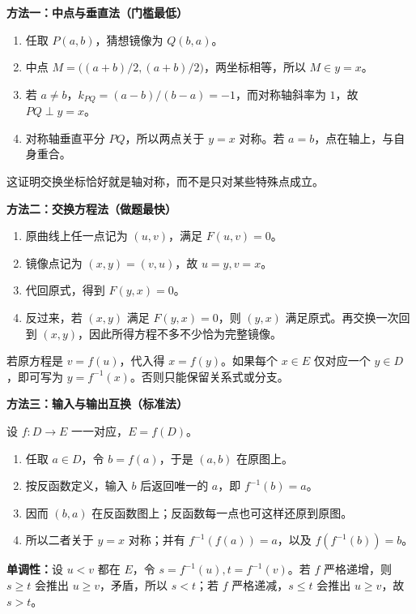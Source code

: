 \clearpage
\begin{proofbox}
\textbf{\textcolor{CProof}{方法一：中点与垂直法（门槛最低）}}


\begin{enumerate}[leftmargin=*,itemsep=.45em]
\item 任取 $P(a,b)$，猜想镜像为 $Q(b,a)$。
\item 中点 $M=\bigl((a+b)/2,(a+b)/2\bigr)$，两坐标相等，所以 $M\in y=x$。
\item 若 $a\ne b$，$k_{PQ}=(a-b)/(b-a)=-1$，而对称轴斜率为 $1$，故 $PQ\perp y=x$。
\item 对称轴垂直平分 $PQ$，所以两点关于 $y=x$ 对称。若 $a=b$，点在轴上，与自身重合。
\end{enumerate}
这证明交换坐标恰好就是轴对称，而不是只对某些特殊点成立。
\end{proofbox}
\clearpage
\begin{proofbox}
\textbf{\textcolor{CProof}{方法二：交换方程法（做题最快）}}


\begin{enumerate}[leftmargin=*,itemsep=.45em]
\item 原曲线上任一点记为 $(u,v)$，满足 $F(u,v)=0$。
\item 镜像点记为 $(x,y)=(v,u)$，故 $u=y,v=x$。
\item 代回原式，得到 $F(y,x)=0$。
\item 反过来，若 $(x,y)$ 满足 $F(y,x)=0$，则 $(y,x)$ 满足原式。再交换一次回到 $(x,y)$，因此所得方程不多不少恰为完整镜像。
\end{enumerate}
若原方程是 $v=f(u)$，代入得 $x=f(y)$。如果每个 $x\in E$ 仅对应一个 $y\in D$，即可写为 $y=f^{-1}(x)$。否则只能保留关系式或分支。
\end{proofbox}
\clearpage
\begin{proofbox}
\textbf{\textcolor{CProof}{方法三：输入与输出互换（标准法）}}


设 $f:D\to E$ 一一对应，$E=f(D)$。
\begin{enumerate}[leftmargin=*,itemsep=.45em]
\item 任取 $a\in D$，令 $b=f(a)$，于是 $(a,b)$ 在原图上。
\item 按反函数定义，输入 $b$ 后返回唯一的 $a$，即 $f^{-1}(b)=a$。
\item 因而 $(b,a)$ 在反函数图上；反函数每一点也可这样还原到原图。
\item 所以二者关于 $y=x$ 对称；并有 $f^{-1}(f(a))=a$，以及 $f(f^{-1}(b))=b$。
\end{enumerate}
\textbf{单调性：}设 $u<v$ 都在 $E$，令 $s=f^{-1}(u),t=f^{-1}(v)$。若 $f$ 严格递增，则 $s\ge t$ 会推出 $u\ge v$，矛盾，所以 $s<t$；若 $f$ 严格递减，$s\le t$ 会推出 $u\ge v$，故 $s>t$。
\end{proofbox}
